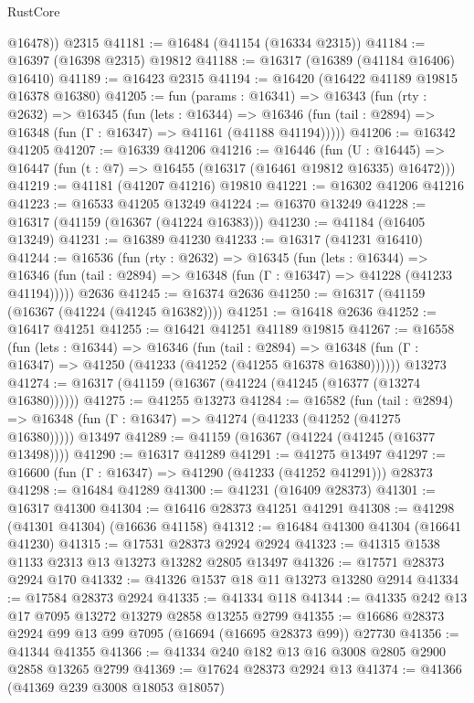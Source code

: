 \begin{lexlean}{RustCore}
\begin{coremodule}
        @16478))
    @2315
@41181 := @16484 (@41154 (@16334 @2315))
@41184 := @16397 (@16398 @2315) @19812
@41188 := @16317 (@16389 (@41184 @16406) @16410)
@41189 := @16423 @2315
@41194 := @16420 (@16422 @41189 @19815 @16378 @16380)
@41205 := fun (params : @16341) =>
  @16343
    (fun (rty : @2632) =>
    @16345
      (fun (lets : @16344) =>
      @16346 (fun (tail : @2894) => @16348 (fun (Γ : @16347) => @41161 (@41188 @41194)))))
@41206 := @16342 @41205
@41207 := @16339 @41206
@41216 := @16446
    (fun (U : @16445) => @16447 (fun (t : @7) => @16455 (@16317 (@16461 @19812 @16335) @16472)))
@41219 := @41181 (@41207 @41216) @19810
@41221 := @16302 @41206 @41216
@41223 := @16533 @41205 @13249
@41224 := @16370 @13249
@41228 := @16317 (@41159 (@16367 (@41224 @16383)))
@41230 := @41184 (@16405 @13249)
@41231 := @16389 @41230
@41233 := @16317 (@41231 @16410)
@41244 := @16536
    (fun (rty : @2632) =>
    @16345
      (fun (lets : @16344) =>
      @16346 (fun (tail : @2894) => @16348 (fun (Γ : @16347) => @41228 (@41233 @41194)))))
    @2636
@41245 := @16374 @2636
@41250 := @16317 (@41159 (@16367 (@41224 (@41245 @16382))))
@41251 := @16418 @2636
@41252 := @16417 @41251
@41255 := @16421 @41251 @41189 @19815
@41267 := @16558
    (fun (lets : @16344) =>
    @16346
      (fun (tail : @2894) =>
      @16348 (fun (Γ : @16347) => @41250 (@41233 (@41252 (@41255 @16378 @16380))))))
    @13273
@41274 := @16317 (@41159 (@16367 (@41224 (@41245 (@16377 (@13274 @16380))))))
@41275 := @41255 @13273
@41284 := @16582
    (fun (tail : @2894) => @16348 (fun (Γ : @16347) => @41274 (@41233 (@41252 (@41275 @16380)))))
    @13497
@41289 := @41159 (@16367 (@41224 (@41245 (@16377 @13498))))
@41290 := @16317 @41289
@41291 := @41275 @13497
@41297 := @16600 (fun (Γ : @16347) => @41290 (@41233 (@41252 @41291))) @28373
@41298 := @16484 @41289
@41300 := @41231 (@16409 @28373)
@41301 := @16317 @41300
@41304 := @16416 @28373 @41251 @41291
@41308 := @41298 (@41301 @41304) (@16636 @41158)
@41312 := @16484 @41300 @41304 (@16641 @41230)
@41315 := @17531 @28373 @2924 @2924
@41323 := @41315 @1538 @1133 @2313 @13 @13273 @13282 @2805 @13497
@41326 := @17571 @28373 @2924 @170
@41332 := @41326 @1537 @18 @11 @13273 @13280 @2914
@41334 := @17584 @28373 @2924
@41335 := @41334 @118
@41344 := @41335 @242 @13 @17 @7095 @13272 @13279 @2858 @13255 @2799
@41355 := @16686 @28373 @2924 @99 @13 @99 @7095 (@16694 (@16695 @28373 @99)) @27730
@41356 := @41344 @41355
@41366 := @41334 @240 @182 @13 @16 @3008 @2805 @2900 @2858 @13265 @2799
@41369 := @17624 @28373 @2924 @13
@41374 := @41366 (@41369 @239 @3008 @18053 @18057)

\end{coremodule}
\end{lexlean}

